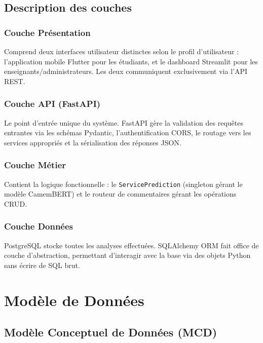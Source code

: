 \subsection{Description des couches}

\subsubsection{Couche Présentation}
Comprend deux interfaces utilisateur distinctes selon le profil d'utilisateur :
l'application mobile Flutter pour les étudiants, et le dashboard Streamlit
pour les enseignants/administrateurs. Les deux communiquent exclusivement
via l'API REST.

\subsubsection{Couche API (FastAPI)}
Le point d'entrée unique du système. FastAPI gère la validation des
requêtes entrantes via les schémas Pydantic, l'authentification CORS,
le routage vers les services appropriés et la sérialisation des réponses
JSON.

\subsubsection{Couche Métier}
Contient la logique fonctionnelle : le \texttt{ServicePrediction} (singleton
gérant le modèle CamemBERT) et le routeur de commentaires gérant les
opérations CRUD.

\subsubsection{Couche Données}
PostgreSQL stocke toutes les analyses effectuées. SQLAlchemy ORM fait
office de couche d'abstraction, permettant d'interagir avec la base via
des objets Python sans écrire de SQL brut.

\section{Modèle de Données}

\subsection{Modèle Conceptuel de Données (MCD)}

